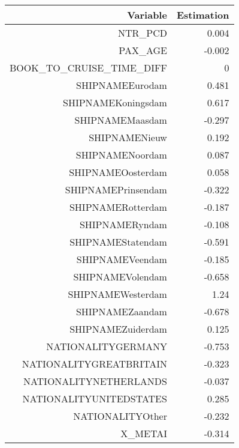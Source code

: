 \documentclass{article}
\begin{document}
\begin{table}[H]
	\centering 
	\begin{tabular}{rr}
		Variable & Estimation \\ 
		\hline 
		\hline 
		NTR\_PCD	                 &         0.004                \\ 
		PAX\_AGE	                 &        -0.002                \\ 
		BOOK\_TO\_CRUISE\_TIME\_DIFF &             0                \\ 
		SHIPNAMEEurodam	         &         0.481                \\ 
		SHIPNAMEKoningsdam	 &                 0.617        \\ 
		SHIPNAMEMaasdam	         &         -0.297               \\ 
		SHIPNAMENieuw            &            0.192             \\ 
		SHIPNAMENoordam	         &         0.087                \\ 
		SHIPNAMEOosterdam	 &                 0.058        \\ 
		SHIPNAMEPrinsendam	 &                 -0.322       \\ 
		SHIPNAMERotterdam	 &                 -0.187       \\ 
		SHIPNAMERyndam	         &         -0.108               \\ 
		SHIPNAMEStatendam	 &                 -0.591       \\ 
		SHIPNAMEVeendam	         &         -0.185               \\ 
		SHIPNAMEVolendam	 &                 -0.658       \\ 
		SHIPNAMEWesterdam	 &                 1.24         \\ 
		SHIPNAMEZaandam	         &         -0.678               \\ 
		SHIPNAMEZuiderdam	 &                 0.125        \\ 
		NATIONALITYGERMANY       &              -0.753          \\ 
		NATIONALITYGREATBRITAIN	 &              -0.323          \\ 
		NATIONALITYNETHERLANDS	 &                 -0.037       \\ 
		NATIONALITYUNITEDSTATES	 &               0.285          \\ 
		NATIONALITYOther	 &                 -0.232       \\ 
		X\_METAI	                 &                -0.314        \\ 

\end{tabular}
\end{table}
\end{document}

